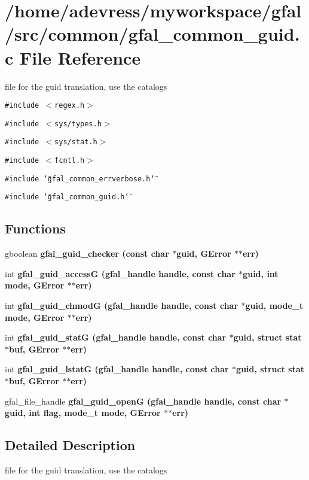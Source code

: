 \section{/home/adevress/myworkspace/gfal/src/common/gfal\_\-common\_\-guid.c File Reference}
\label{gfal__common__guid_8c}
file for the guid translation, use the catalogs 

{\tt \#include $<$regex.h$>$}\par
{\tt \#include $<$sys/types.h$>$}\par
{\tt \#include $<$sys/stat.h$>$}\par
{\tt \#include $<$fcntl.h$>$}\par
{\tt \#include \char`\"{}gfal\_\-common\_\-errverbose.h\char`\"{}}\par
{\tt \#include \char`\"{}gfal\_\-common\_\-guid.h\char`\"{}}\par
\subsection*{Functions}
\begin{CompactItemize}
\item 
gboolean \bf{gfal\_\-guid\_\-checker} (const char $\ast$guid, GError $\ast$$\ast$err)
\item 
int \bf{gfal\_\-guid\_\-access\-G} (gfal\_\-handle handle, const char $\ast$guid, int mode, GError $\ast$$\ast$err)
\item 
int \bf{gfal\_\-guid\_\-chmod\-G} (gfal\_\-handle handle, const char $\ast$guid, mode\_\-t mode, GError $\ast$$\ast$err)
\item 
int \bf{gfal\_\-guid\_\-stat\-G} (gfal\_\-handle handle, const char $\ast$guid, struct stat $\ast$buf, GError $\ast$$\ast$err)
\item 
int \bf{gfal\_\-guid\_\-lstat\-G} (gfal\_\-handle handle, const char $\ast$guid, struct stat $\ast$buf, GError $\ast$$\ast$err)
\item 
gfal\_\-file\_\-handle \bf{gfal\_\-guid\_\-open\-G} (gfal\_\-handle handle, const char $\ast$guid, int flag, mode\_\-t mode, GError $\ast$$\ast$err)
\end{CompactItemize}


\subsection{Detailed Description}
file for the guid translation, use the catalogs 

